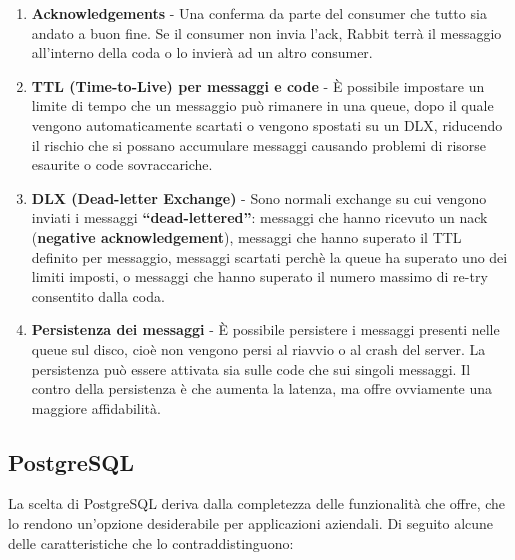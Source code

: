 \begin{itemize}
    \begin{enumerate}
      \item
        \textbf{Acknowledgements} -  Una conferma da parte del consumer che tutto sia andato a buon fine.
        Se il consumer non invia l'ack, Rabbit terr\`a il messaggio all'interno della coda o lo invier\`a ad un altro consumer.
      \item \textbf{TTL (Time-to-Live) per messaggi e code} - \`E possibile impostare un limite di tempo che un messaggio pu\`o rimanere
        in una queue, dopo il quale vengono automaticamente scartati o vengono spostati su un DLX, riducendo il rischio che si
        possano accumulare messaggi causando problemi di risorse esaurite o code sovraccariche.
      \item \textbf{DLX (Dead-letter Exchange)} - Sono normali exchange su cui vengono inviati i messaggi \textbf{``dead-lettered''}: messaggi che hanno
        ricevuto un nack (\textbf{negative acknowledgement}), messaggi che hanno superato il TTL definito per messaggio, messaggi
        scartati perch\`e la queue ha superato uno dei limiti imposti, o messaggi che hanno superato il numero massimo di re-try consentito dalla coda.
      \item \textbf{Persistenza dei messaggi} -  \`E possibile persistere i messaggi presenti nelle queue sul disco,
        cio\`e non vengono persi al riavvio o al crash del server. La persistenza pu\`o essere attivata sia sulle code che sui singoli messaggi.
        Il contro della persistenza \`e che aumenta la latenza, ma offre ovviamente una maggiore affidabilit\`a.
    \end{enumerate}
\end{itemize}

\subsection{PostgreSQL}
La scelta di PostgreSQL deriva dalla completezza delle funzionalit\`a che offre, che lo rendono un'opzione desiderabile per applicazioni aziendali.
Di seguito alcune delle caratteristiche che lo contraddistinguono:

